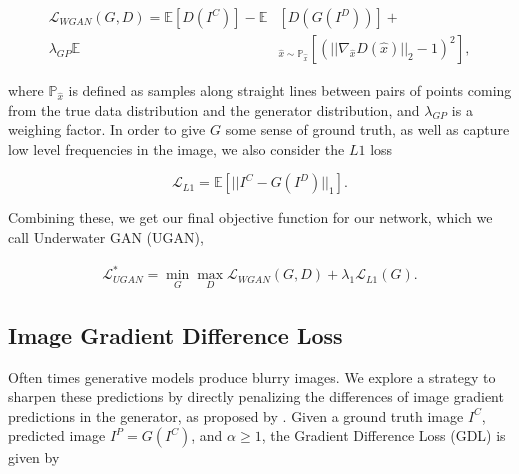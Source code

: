 \documentclass[conference,reqno]{IEEEtran}
\begin{document}
\begin{equation}
\begin{aligned}
   \mathcal{L}_{WGAN}(G,D) = \mathbb{E} [D(I^C)] - \mathbb{E} & [D(G(I^D))] + \\
   \lambda_{GP} \mathbb{E} & _{\hat{x} \sim \mathbb{P}_{\hat{x}}} [(|| \nabla_{\hat{x}} D(\hat{x})||_2 -1)^2 ],
\end{aligned}
\end{equation}


\noindent where $\mathbb{P}_{\hat{x}}$ is defined as samples along straight lines between pairs of points coming from
the true data distribution and the generator distribution, and $\lambda_{GP}$ is a weighing factor. In order to give $G$
some sense of ground truth, as well as capture low level frequencies in the image, we also consider the $L1$ loss

\begin{equation}
   \mathcal{L}_{L1} = \mathbb{E} [ || I^C - G(I^D) ||_1 ].
\end{equation}

\noindent Combining these, we get our final objective function for our network, which we call Underwater GAN (UGAN),

\begin{equation}
   \begin{aligned}
      \mathcal{L}_{UGAN}^* = \min\limits_{G}\max\limits_{D} \mathcal{L}_{WGAN}(G,D) + \lambda_{1} \mathcal{L}_{L1}(G).
   \end{aligned}
\end{equation}


\subsection{Image Gradient Difference Loss}
Often times generative models produce blurry images. We explore a strategy to sharpen these predictions by
directly penalizing the differences of image gradient predictions in the generator, as proposed by
\cite{mathieu2015deep}. Given a ground truth image $I^C$, predicted image $I^P = G(I^C)$, and $\alpha \geq 1$, the
Gradient Difference Loss (GDL) is given by
\end{document}
